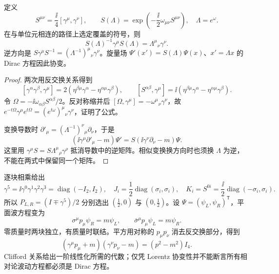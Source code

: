 \begin{proposition}
定义
\[
 S^{\mu\nu}=\frac{\ii}{4}[\gamma^\mu,\gamma^\nu],\qquad
 S(\Lambda)=\exp\!\left(-\frac{\ii}{2}\omega_{\mu\nu}S^{\mu\nu}\right),\quad \Lambda=e^\omega.
\]
在与单位元相连的路径上选定覆盖的符号，则
\begin{equation}
 S(\Lambda)^{-1}\gamma^\mu S(\Lambda)=\Lambda^\mu{}_\nu\gamma^\nu.
 \label{eq:gamma-lorentz}
\end{equation}
逆方向是 $S\gamma^\mu S^{-1}=(\Lambda^{-1})^\mu{}_\nu\gamma^\nu$。旋量场 $\Psi'(x')=S(\Lambda)\Psi(x)$、$x'=\Lambda x$ 的 Dirac 方程因此协变。
\end{proposition}
\begin{proof}
两次用反交换关系得到
\[
 [\gamma^\alpha\gamma^\beta,\gamma^\mu]
 =2(\eta^{\beta\mu}\gamma^\alpha-\eta^{\alpha\mu}\gamma^\beta),\qquad
 [S^{\alpha\beta},\gamma^\mu]
 =\ii(\eta^{\beta\mu}\gamma^\alpha-\eta^{\alpha\mu}\gamma^\beta).
\]
令 $\Omega=-\ii\omega_{\alpha\beta}S^{\alpha\beta}/2$。反对称缩并后
$[\Omega,\gamma^\mu]=-\omega^\mu{}_\nu\gamma^\nu$，故 $e^{-t\Omega}\gamma^\mu e^{t\Omega}=(e^{t\omega})^\mu{}_\nu\gamma^\nu$，证明了公式。

变换导数时 $\partial'_\mu=(\Lambda^{-1})^\nu{}_\mu\partial_\nu$，于是
\[
 (\ii\gamma^\mu\partial'_\mu-m)\Psi'
 =S(\ii\gamma^\nu\partial_\nu-m)\Psi.
\]
这里用 $\gamma^\mu S=S\Lambda^\mu{}_\rho\gamma^\rho$ 抵消导数中的逆矩阵。相似变换换方向时也须换 $\Lambda$ 为逆，不能在两式中保留同一个矩阵。
\end{proof}

\begin{workedexample}[手征块及质量壳]
逐块相乘给出
\[
 \gamma^5=\ii\gamma^0\gamma^1\gamma^2\gamma^3
 =\operatorname{diag}(-I_2,I_2),\quad
 J_i=\frac12\operatorname{diag}(\sigma_i,\sigma_i),\quad
 K_i=S^{0i}=\frac{\ii}{2}\operatorname{diag}(-\sigma_i,\sigma_i).
\]
所以 $P_{L,R}=(I\mp\gamma^5)/2$ 分别选出 $(\tfrac12,0)$ 与 $(0,\tfrac12)$。设 $\Psi=(\psi_L,\psi_R)^{\mathsf T}$，平面波方程变为
\begin{equation}
 \sigma^\mu p_\mu\psi_R=m\psi_L,\qquad
 \bar\sigma^\mu p_\mu\psi_L=m\psi_R.
 \label{eq:weyl-dirac-blocks}
\end{equation}
零质量时两块独立，有质量时联结。平方用对称的 $p_\mu p_\nu$ 消去反交换部分，得到
\begin{equation}
 (\gamma^\mu p_\mu+m)(\gamma^\nu p_\nu-m)=(p^2-m^2)I_4.
 \label{eq:dirac-square-mass-shell}
\end{equation}
Clifford 关系给出一阶线性化所需的代数；仅凭 Lorentz 协变性并不能断言所有相对论波动方程都必须是 Dirac 方程。
\end{workedexample}

